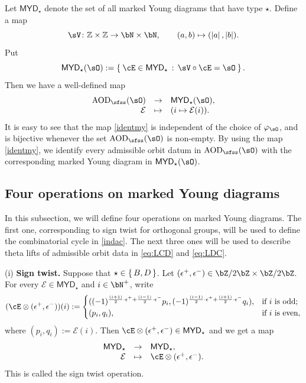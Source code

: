 \documentclass[11pt,a4paper]{amsart}
\def\MYD{{\mathsf{MYD}}}
\def\abs#1{\left|{#1}\right|}
\newcommand{\CE}{{\mathcal {E}}}
\newcommand{\Z}{\mathbb{Z}}
\newcommand{\be}{\begin {equation}}
\newcommand{\ee}{\end {equation}}
\numberwithin{equation}{section}
\theoremstyle{remark}
\def\MYD{{\mathsf{MYD}}}
\def\AOD{\mathrm{AOD}}
\def\lotimes{\otimes}
\begin{document}
Let $\MYD_{\star}$ denote the set of all marked Young diagrams that have type $\star$. Define a map
\begin{equation}\label{eq:F1}
\sV\colon \Z\times \Z\rightarrow \bN\times \bN,\qquad (a,b)\mapsto (\abs{a},\abs{b}).
\end{equation}
Put
\[
  \MYD_\star(\sO) := \Set{\cE\in \MYD_\star  \,:\, \sV\circ \cE=\sO }.
\]
Then we have a well-defined map
\be\label{identmy}
\begin{array}{rcl}
\AOD_{\sfss}(\sO) & \rightarrow & \MYD_\star(\sO),\\
    \CE&\mapsto&(i\mapsto \CE(i)). 
    \end{array}
\ee
It is easy to see that the map \eqref{identmy} is independent of the choice of $\varphi_\sO$, and is bijective whenever the set $\AOD_{\sfss}(\sO)$ is non-empty. By using the map \eqref{identmy}, we identify every admissible orbit datum in $\AOD_{\sfss}(\sO)$ with the corresponding marked Young diagram in $\MYD_\star(\sO)$. 


\subsection{Four operations on marked Young diagrams}\label{fouro}


In this subsection, we will define four operations on marked Young diagrams. The first one, corresponding to sign twist for orthogonal groups, will be used to define the combinatorial cycle in \eqref{indac}. The next three ones will be used to describe theta lifts of admissible orbit data in \eqref{eq:LCD} and \eqref{eq:LDC}.

\smallskip



(i) {\bf  Sign twist.}
Suppose that $\star\in \set{B,D}$. Let $(\epsilon^{+},\epsilon^{-})\in \bZ/2\bZ\times \bZ/2\bZ$. For every $\CE\in \MYD_{\star}$  and $i\in \bN^+$, write
\[
(\cE \lotimes(\epsilon^{+},\epsilon^{-}))(i) := \begin{cases}
  ( (-1)^{\frac{(i+1)}{2}\cdot \epsilon^{+} +\frac{(i-1)}{2}\cdot \epsilon^{-}}p_{i},(-1)^{\frac{(i-1)}{2}\cdot \epsilon^{+} +\frac{(i+1)}{2}\cdot \epsilon^{-}} q_{i}),
  & \text{if $i$  is odd;}\\
  ( p_{i},q_{i}), & \text{if $i$  is even,}
\end{cases}
\]
where $( p_{i},q_{i}):=\CE(i)$. Then $\cE \lotimes(\epsilon^{+},\epsilon^{-})\in \MYD_{\star}$ and we get a  map 
\be\label{stwist}
\begin{array}{rcl}
  \MYD_{\star}&\rightarrow&\MYD_{\star}, \\
   \CE&\mapsto &\cE \lotimes(\epsilon^{+},\epsilon^{-}).
   \end{array}
\ee
This is called the sign twist operation. 
\end{document}
